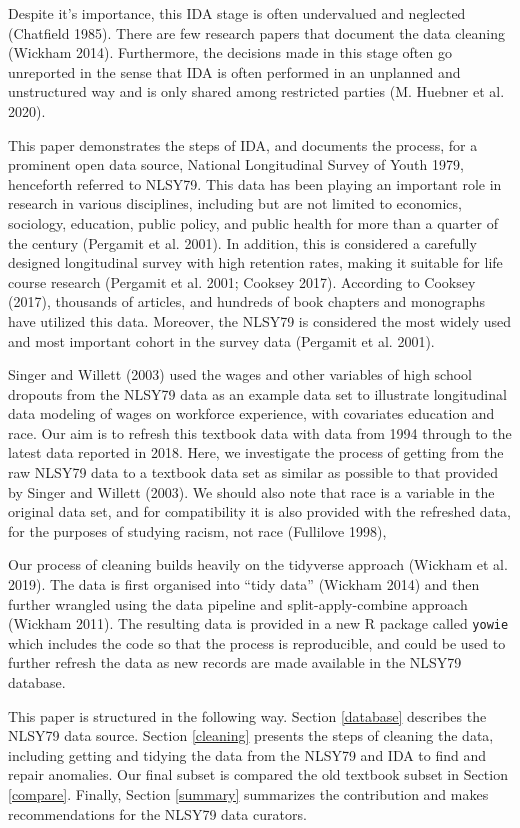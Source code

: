 \documentclass{article}
\begin{document}
Despite it's importance, this IDA stage is often undervalued and neglected (Chatfield 1985). There are few research papers that document the data cleaning (Wickham 2014). Furthermore, the decisions made in this stage often go unreported in the sense that IDA is often performed in an unplanned and unstructured way and is only shared among restricted parties (M. Huebner et al. 2020).

This paper demonstrates the steps of IDA, and documents the process, for a prominent open data source, National Longitudinal Survey of Youth 1979, henceforth referred to NLSY79. This data has been playing an important role in research in various disciplines, including but are not limited to economics, sociology, education, public policy, and public health for more than a quarter of the century (Pergamit et al. 2001). In addition, this is considered a carefully designed longitudinal survey with high retention rates, making it suitable for life course research (Pergamit et al. 2001; Cooksey 2017). According to Cooksey (2017), thousands of articles, and hundreds of book chapters and monographs have utilized this data. Moreover, the NLSY79 is considered the most widely used and most important cohort in the survey data (Pergamit et al. 2001).

Singer and Willett (2003) used the wages and other variables of high school dropouts from the NLSY79 data as an example data set to illustrate longitudinal data modeling of wages on workforce experience, with covariates education and race. Our aim is to refresh this textbook data with data from 1994 through to the latest data reported in 2018. Here, we investigate the process of getting from the raw NLSY79 data to a textbook data set as similar as possible to that provided by Singer and Willett (2003). We should also note that race is a variable in the original data set, and for compatibility it is also provided with the refreshed data, for the purposes of studying racism, not race (Fullilove 1998),

Our process of cleaning builds heavily on the tidyverse approach (Wickham et al. 2019). The data is first organised into ``tidy data'' (Wickham 2014) and then further wrangled using the data pipeline and split-apply-combine approach (Wickham 2011). The resulting data is provided in a new R package called \texttt{yowie} which includes the code so that the process is reproducible, and could be used to further refresh the data as new records are made available in the NLSY79 database.

This paper is structured in the following way. Section \ref{database} describes the NLSY79 data source. Section \ref{cleaning} presents the steps of cleaning the data, including getting and tidying the data from the NLSY79 and IDA to find and repair anomalies. Our final subset is compared the old textbook subset in Section \ref{compare}. Finally, Section \ref{summary} summarizes the contribution and makes recommendations for the NLSY79 data curators.
\end{document}
